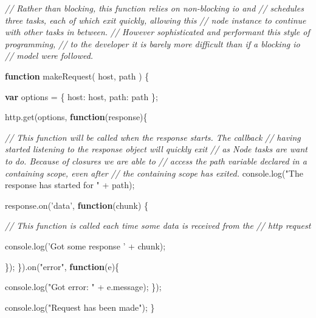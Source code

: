 \documentclass[]{article}
\newenvironment{Shaded}{}{}
\newcommand{\KeywordTok}[1]{\textcolor[rgb]{0.00,0.44,0.13}{\textbf{{#1}}}}
\newcommand{\DataTypeTok}[1]{\textcolor[rgb]{0.56,0.13,0.00}{{#1}}}
\newcommand{\StringTok}[1]{\textcolor[rgb]{0.25,0.44,0.63}{{#1}}}
\newcommand{\CommentTok}[1]{\textcolor[rgb]{0.38,0.63,0.69}{\textit{{#1}}}}
\newcommand{\OtherTok}[1]{\textcolor[rgb]{0.00,0.44,0.13}{{#1}}}
\newcommand{\FunctionTok}[1]{\textcolor[rgb]{0.02,0.16,0.49}{{#1}}}
\newcommand{\NormalTok}[1]{{#1}}
\begin{document}
\begin{Shaded}
\begin{Highlighting}[]

\CommentTok{// Rather than blocking, this function relies on non-blocking io and}
\CommentTok{// schedules three tasks, each of which exit quickly, allowing this}
\CommentTok{// node instance to continue with other tasks in between. }
\CommentTok{// However sophisticated and performant this style of programming, }
\CommentTok{// to the developer it is barely more difficult than if a blocking io}
\CommentTok{// model were followed. }

\KeywordTok{function} \FunctionTok{makeRequest}\NormalTok{( host, path ) \{}

   \KeywordTok{var} \NormalTok{options = \{ }\DataTypeTok{host}\NormalTok{: host, }\DataTypeTok{path}\NormalTok{: path \};}
   
   \OtherTok{http}\NormalTok{.}\FunctionTok{get}\NormalTok{(options, }\KeywordTok{function}\NormalTok{(response)\{}
      
      \CommentTok{// This function will be called when the response starts. The callback}
      \CommentTok{// having started listening to the response object will quickly exit}
      \CommentTok{// as Node tasks are want to do. Because of closures we are able to}
      \CommentTok{// access the path variable declared in a containing scope, even after}
      \CommentTok{// the containing scope has exited.      }
      \OtherTok{console}\NormalTok{.}\FunctionTok{log}\NormalTok{(}\StringTok{"The response has started for "} \NormalTok{+ path);}
   
      \OtherTok{response}\NormalTok{.}\FunctionTok{on}\NormalTok{(}\StringTok{'data'}\NormalTok{, }\KeywordTok{function}\NormalTok{(chunk) \{}
      
         \CommentTok{// This function is called each time some data is received from the }
         \CommentTok{// http request}
         
         \OtherTok{console}\NormalTok{.}\FunctionTok{log}\NormalTok{(}\StringTok{'Got some response '} \NormalTok{+ chunk);}
       
      \NormalTok{\});}
   \NormalTok{\}).}\FunctionTok{on}\NormalTok{(}\StringTok{"error"}\NormalTok{, }\KeywordTok{function}\NormalTok{(e)\{}
   
      \OtherTok{console}\NormalTok{.}\FunctionTok{log}\NormalTok{(}\StringTok{"Got error: "} \NormalTok{+ }\OtherTok{e}\NormalTok{.}\FunctionTok{message}\NormalTok{);}
   \NormalTok{\});}
   
   \OtherTok{console}\NormalTok{.}\FunctionTok{log}\NormalTok{(}\StringTok{"Request has been made"}\NormalTok{);}
\NormalTok{\}}
\end{Highlighting}
\end{Shaded}
\end{document}
